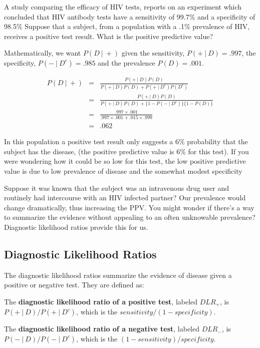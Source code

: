 \documentclass[]{article}
\begin{document}
A study comparing the efficacy of HIV tests, reports on an experiment
which concluded that HIV antibody tests have a sensitivity of 99.7\% and
a specificity of 98.5\% Suppose that a subject, from a population with a
.1\% prevalence of HIV, receives a positive test result. What is the
positive predictive value?

Mathematically, we want $P(D ~|~ +)$ given the sensitivity,
$P(+ ~|~ D) = .997$, the specificity, $P(- ~|~ D^c) =.985$ and the
prevalence $P(D) = .001$.

\begin{eqnarray*}
P(D ~|~ +) & = &\frac{P(+~|~D)P(D)}{P(+~|~D)P(D) + P(+~|~D^c)P(D^c)}\\
 & = & \frac{P(+~|~D)P(D)}{P(+~|~D)P(D) + \{1-P(-~|~D^c)\}\{1 - P(D)\}} \\
 & = & \frac{.997\times .001}{.997 \times .001 + .015 \times .999}\\
 & = & .062
\end{eqnarray*}

In this population a positive test result only suggests a 6\%
probability that the subject has the disease, (the positive predictive
value is 6\% for this test). If you were wondering how it could be so
low for this test, the low positive predictive value is due to low
prevalence of disease and the somewhat modest specificity

Suppose it was known that the subject was an intravenous drug user and
routinely had intercourse with an HIV infected partner? Our prevalence
would change dramatically, thus increasing the PPV. You might wonder if
there's a way to summarize the evidence without appealing to an often
unknowable prevalence? Diagnostic likelihood ratios provide this for us.

\subsection{Diagnostic Likelihood
Ratios}\label{diagnostic-likelihood-ratios}

The diagnostic likelihood ratios summarize the evidence of disease given
a positive or negative test. They are defined as:

The \textbf{diagnostic likelihood ratio of a positive test}, labeled
$DLR_+$, is $P(+ ~|~ D) / P(+ ~|~ D^c)$, which is the
$sensitivity / (1 - specificity)$.

The \textbf{diagnostic likelihood ratio of a negative test}, labeled
$DLR_-$, is $P(- ~|~ D) / P(- ~|~ D^c)$, which is the
$(1 - sensitivity) / specificity$.
\end{document}
